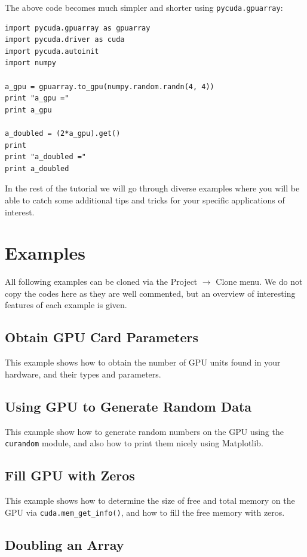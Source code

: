\documentclass[article,A4,12pt]{llncs}
\begin{document}
The above code becomes much simpler and shorter using {\tt pycuda.gpuarray}:

\begin{verbatim}
import pycuda.gpuarray as gpuarray
import pycuda.driver as cuda
import pycuda.autoinit
import numpy

a_gpu = gpuarray.to_gpu(numpy.random.randn(4, 4))
print "a_gpu ="
print a_gpu

a_doubled = (2*a_gpu).get()
print
print "a_doubled ="
print a_doubled
\end{verbatim}
In the rest of the tutorial we will go through diverse examples where
you will be able to catch some additional tips and tricks for your 
specific applications of interest.

\section{Examples}

All following examples can be cloned via the Project $\rightarrow$ Clone menu.
We do not copy the codes here as they are well commented, but an overview of 
interesting features of each example is given.

\subsection{Obtain GPU Card Parameters}

This example shows how to obtain the number of GPU units found in your hardware, and 
their types and parameters. 

\subsection{Using GPU to Generate Random Data}

This example show how to generate random numbers on the GPU using the {\tt curandom}
module, and also how to print them nicely using Matplotlib.

\subsection{Fill GPU with Zeros}

This example shows how to determine the size of free and total 
memory on the GPU via {\tt cuda.mem\_get\_info()}, and how to fill 
the free memory with zeros.

\subsection{Doubling an Array}
\end{document}
